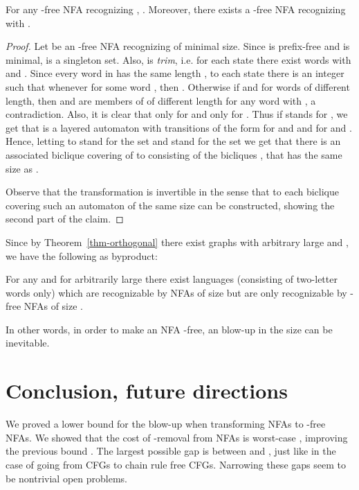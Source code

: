 \documentclass[submission]{llncs}
\begin{document}
\begin{proposition}
For any -free NFA  recognizing , .
Moreover, there exists a -free NFA  recognizing  with .
\end{proposition}
\begin{proof}
Let  be an -free NFA recognizing  of minimal size.
Since  is prefix-free and  is minimal,  is a singleton set.
Also,  is \emph{trim}, i.e. for each state  there exist words  with  and .
Since every word in  has the same length , to each state  there is an integer  such that
whenever  for some word , then . Otherwise if  and  for words 
of different length, then  and  are members of  of different length for any word  with ,
a contradiction.
Also, it is clear that  only for  and  only for . Thus if  stands for ,
we get that  is a layered automaton with transitions of the form  for  and 
and  for  and .
Hence, letting  to stand for the set  and  stand for the set
 we get that there is an associated biclique covering  of  to 
consisting of the bicliques ,  that has the same size as .

Observe that the transformation is invertible in the sense that to each biclique covering  such an
automaton of the same size can be constructed, showing the second part of the claim.
\end{proof}

Since by Theorem~\ref{thm-orthogonal} there exist graphs with arbitrary large  and ,
we have the following as byproduct:
\begin{theorem}
\label{thm-epsilon}
For any  and for arbitrarily large  there exist languages (consisting of two-letter words only) which are recognizable
by NFAs of size  but are only recognizable by -free NFAs of size .

In other words, in order to make an NFA -free, an  blow-up in the size can be inevitable.
\end{theorem}

\section{Conclusion, future directions}
\label{sec-conclusion}

We proved a lower bound for the blow-up when transforming NFAs to -free NFAs.
We showed that the cost of -removal from NFAs is worst-case , improving the
previous bound .
The largest possible gap is between  and , just like in the case of going  from CFGs to chain rule free CFGs.
Narrowing these gaps seem to be nontrivial open problems.
\end{document}
